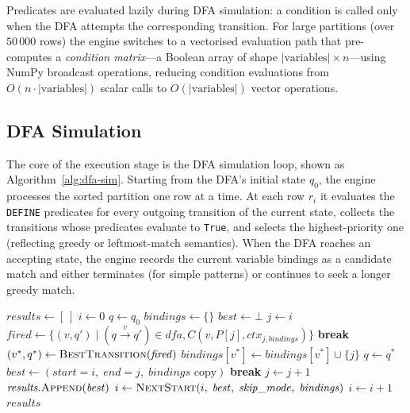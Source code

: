 \noindent
Predicates are evaluated lazily during DFA simulation: a condition
is called only when the DFA attempts the corresponding transition.
For large partitions (over $50\,000$ rows) the engine switches to a
vectorised evaluation path that pre-computes a
\emph{condition matrix}—a Boolean array of shape
$|\text{variables}| \times n$—using NumPy broadcast operations,
reducing condition evaluations from $O(n \cdot |\text{variables}|)$
scalar calls to $O(|\text{variables}|)$ vector operations.

\subsection{DFA Simulation}
\label{subsec:meth-exec-dfa-sim}

The core of the execution stage is the DFA simulation loop, shown
as Algorithm~\ref{alg:dfa-sim}.  Starting from the DFA's initial
state $q_0$, the engine processes the sorted partition one row at a
time.  At each row $r_i$ it evaluates the \texttt{DEFINE} predicates
for every outgoing transition of the current state, collects the
transitions whose predicates evaluate to \texttt{True}, and selects
the highest-priority one (reflecting greedy or leftmost-match
semantics).  When the DFA reaches an accepting state, the engine
records the current variable bindings as a candidate match and
either terminates (for simple patterns) or continues to seek a
longer greedy match.

\begin{algorithm}[htbp]
\caption{DFA Simulation Loop for a Single Partition}
\label{alg:dfa-sim}
\begin{algorithmic}[1]
  \State $\mathit{results} \gets [\,]$
  \State $i \gets 0$
    \State $q \gets q_0$
    \State $\mathit{bindings} \gets \{\}$
    \State $\mathit{best} \gets \bot$
    \State $j \gets i$
      \State $\mathit{fired} \gets
        \{(v,q') \mid (q \xrightarrow{v} q') \in \mathit{dfa},
          C(v, P[j], \mathit{ctx}_{j,\mathit{bindings}})\}$
        \State \textbf{break} 
      \EndIf
      \State $(v^*,q^*) \gets \Call{BestTransition}{\mathit{fired}}$
      \State $\mathit{bindings}[v^*] \gets
          \mathit{bindings}[v^*] \cup \{j\}$
      \State $q \gets q^*$
        \State $\mathit{best} \gets
          (\mathit{start}{=}i,\;\mathit{end}{=}j,\;
           \mathit{bindings}\text{ copy})$
          \State \textbf{break}
        \EndIf
      \EndIf
      \State $j \gets j + 1$
    \EndWhile
      \State $\mathit{results}.\textsc{Append}(\mathit{best})$
      \State $i \gets \Call{NextStart}{i,\;\mathit{best},\;
        \mathit{skip\_mode},\;\mathit{bindings}}$
    \Else
      \State $i \gets i + 1$
    \EndIf
  \EndWhile
  \State \Return $\mathit{results}$
\EndProcedure
\end{algorithmic}
\end{algorithm}

